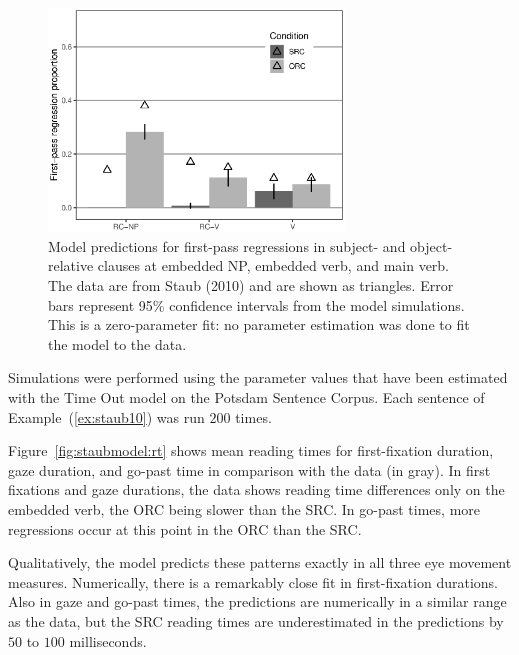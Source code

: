 \documentclass{cambridge7A}\usepackage[]{graphicx}\usepackage[]{color}
\newenvironment{knitrout}{}{} %
\begin{document}
\begin{figure}[tb]
  \centering
\begin{knitrout}
\color{fgcolor}

{\centering \includegraphics[width=0.7\textwidth]{figures/fig-staub10modelREG-1} 

}



\end{knitrout}
\caption[Predicted first-pass regressions from the model for subject- and object-relative clauses.]{Model predictions for first-pass regressions in subject- and object-relative clauses at embedded NP, embedded verb, and main verb. The data are from Staub (2010) and are shown as triangles. Error bars represent 95\% confidence intervals from the model simulations. This is a zero-parameter fit: no parameter estimation was done to fit the model to the data.} \label{fig:staubmodel:reg}
\end{figure}

Simulations were performed using the parameter values that have been estimated with the Time Out model on the Potsdam Sentence Corpus. 
Each sentence of Example~(\ref{ex:staub10}) was run $200$ times.

Figure~\ref{fig:staubmodel:rt} shows mean reading times for first-fixation duration, gaze duration, and go-past time in comparison with the data (in gray). 
In first fixations and gaze durations, the \cite{Staub2010a} data shows reading time differences only on the embedded verb, the  ORC being slower than the  SRC. In go-past times, more regressions occur at this point in the ORC than the SRC.

Qualitatively, the model predicts these patterns exactly in all three eye movement measures. Numerically, there is a remarkably close fit in first-fixation durations. Also in gaze and go-past times, the predictions are numerically in a similar range as the data, but the SRC reading times are underestimated in the predictions by $50$ to $100$ milliseconds.
\end{document}
